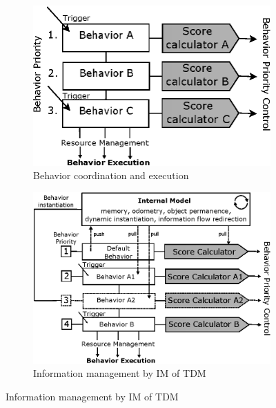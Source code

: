{\begin{figure}[H]
\centering
\begin{subfigure}[b]{0.45\textwidth}
\includegraphics[width=\textwidth]{assets/tdm_priority.eps}
\caption{Behavior coordination and execution}
\label{fig:tdm_priority}
\end{subfigure}%
\hfill
\begin{subfigure}[b]{0.45\textwidth}
\includegraphics[width=\textwidth]{assets/tdm_im.eps}
\caption{Information management by IM of TDM}
\label{fig:tdm_im}
\end{subfigure}%

\end{figure}}
